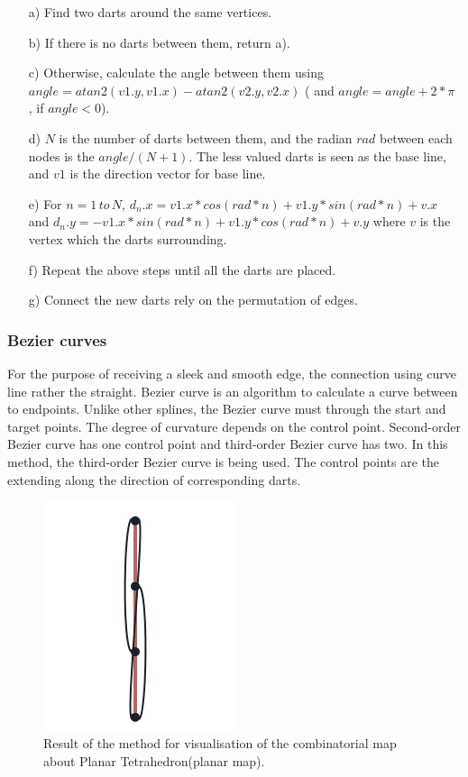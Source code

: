   \begin{itemize}
    \item[a)] Find two darts around the same vertices.
    \item[b)] If there is no darts between them, return a).
    \item[c)] Otherwise, calculate the angle between them using \(angle=atan2(v1.y,v1.x)-atan2(v2.y,v2.x)\) ( and \(angle=angle+2*\pi\) , if \(angle<0\)).
    \item[d)] \(N\) is the number of darts between them, and the radian \(rad\) between each nodes is the \(angle/(N+1)\). The less valued darts is seen as the base line, and \(v1\) is the direction vector for base line.
    \item[e)] For \(n=1 \, to\, N\), \(d_n.x=v1.x*cos(rad*n)+v1.y*sin(rad*n)+v.x\) and \(d_n.y=-v1.x*sin(rad*n)+v1.y*cos(rad*n)+v.y\) where \(v\) is the vertex which the darts surrounding.
    \item[f)] Repeat the above steps until all the darts are placed. 
    \item[g)] Connect the new darts rely on the permutation of edges.
  \end{itemize}

  \subsubsection{Bezier curves} 
  For the purpose of  receiving a sleek and smooth edge, the connection using curve line rather the straight. Bezier curve is an algorithm to calculate a curve between to endpoints. Unlike other splines, the Bezier curve must through the start and target points. The degree of curvature depends on the control point. Second-order Bezier curve has one control point and third-order Bezier curve has two.  In this method, the third-order Bezier curve is being used. The control points are the extending along the direction of corresponding darts.

  \begin{figure}[htb]
    \centering
    \includegraphics[width=0.5\textwidth]{../../image/example1.png}
    \caption{Result of the method for visualisation of the combinatorial map about Planar Tetrahedron(planar map).}
    \label{fig:figures:example1}
  \end{figure}

